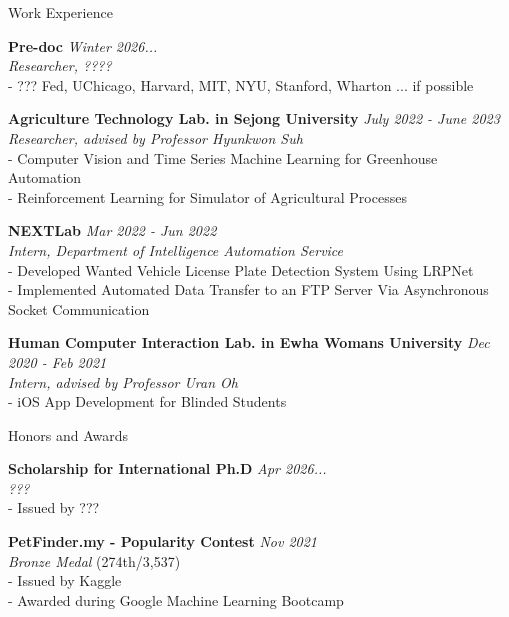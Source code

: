 \documentclass{resume} %
\begin{document}
\begin{rSection}{Work Experience}

{\bf Pre-doc } \hfill {\em Winter 2026...}
\\ \textit {Researcher, ????}
\\ - ???  Fed, UChicago, Harvard, MIT, NYU, Stanford, Wharton ... if possible


{\bf Agriculture Technology Lab. in Sejong University} \hfill {\em July 2022 - June 2023}
\\ \textit {Researcher, advised by Professor Hyunkwon Suh}
\\ - Computer Vision and Time Series Machine Learning for Greenhouse Automation
\\ - Reinforcement Learning for Simulator of Agricultural Processes


{\bf NEXTLab } \hfill {\em Mar 2022 - Jun 2022}
\\ \textit {Intern, Department of Intelligence Automation Service}
\\ - Developed Wanted Vehicle License Plate Detection System Using LRPNet
\\ - Implemented Automated Data Transfer to an FTP Server Via Asynchronous Socket Communication 


{\bf Human Computer Interaction Lab. in Ewha Womans University} \hfill {\em Dec 2020 - Feb 2021}
\\ \textit {Intern, advised by Professor Uran Oh}
\\ - iOS App Development for Blinded Students 

\end{rSection}    



\begin{rSection}{Honors and Awards}

{\bf Scholarship for International Ph.D} \hfill {\em Apr 2026...}
\\ \textit{???} 
\\ - Issued by ???

{\bf PetFinder.my - Popularity Contest} \hfill {\em Nov 2021}
\\ \textit{Bronze Medal} {\small (274th/3,537)}
\\ - Issued by Kaggle
\\ - Awarded during Google Machine Learning Bootcamp

\end{rSection}
\end{document}
